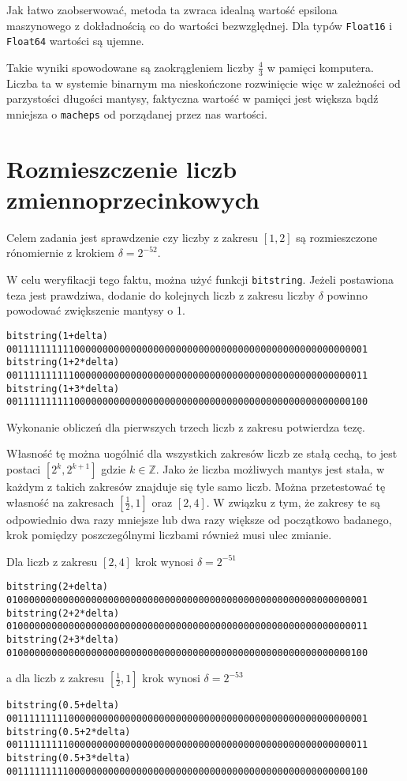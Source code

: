 \documentclass{article}
\begin{document}
Jak łatwo zaobserwować, metoda ta zwraca idealną wartość epsilona maszynowego z dokładnością co do wartości bezwzględnej.
Dla typów \texttt{Float16} i \texttt{Float64} wartości są ujemne.

Takie wyniki spowodowane są zaokrągleniem liczby $\frac{4}{3}$ w pamięci komputera.
Liczba ta w systemie binarnym ma nieskończone rozwinięcie więc w zależności od parzystości długości mantysy, faktyczna wartość w pamięci jest większa bądź mniejsza o \texttt{macheps} od porządanej przez nas wartości.

\section{Rozmieszczenie liczb zmiennoprzecinkowych}

Celem zadania jest sprawdzenie czy liczby z zakresu $[1,2]$ są rozmieszczone rónomiernie z krokiem $\delta = 2^{-52}$.

W celu weryfikacji tego faktu, można użyć funkcji \texttt{bitstring}.
Jeżeli postawiona teza jest prawdziwa, dodanie do kolejnych liczb z zakresu liczby $\delta$ powinno powodować zwiększenie mantysy o 1.

\begin{lstlisting}
bitstring(1+delta) 
0011111111110000000000000000000000000000000000000000000000000001
bitstring(1+2*delta)
0011111111110000000000000000000000000000000000000000000000000011
bitstring(1+3*delta)
0011111111110000000000000000000000000000000000000000000000000100
\end{lstlisting}

Wykonanie obliczeń dla pierwszych trzech liczb z zakresu potwierdza tezę.

Własność tę można uogólnić dla wszystkich zakresów liczb ze stałą cechą, to jest postaci $[2^k, 2^{k+1}]$ gdzie $k \in \mathbb{Z}$.
Jako że liczba możliwych mantys jest stała, w każdym z takich zakresów znajduje się tyle samo liczb.
Można przetestować tę własność na zakresach $[\frac{1}{2}, 1]$ oraz $[2, 4]$.
W związku z tym, że zakresy te są odpowiednio dwa razy mniejsze lub dwa razy większe od początkowo badanego, krok pomiędzy poszczególnymi liczbami również musi ulec zmianie.

Dla liczb z zakresu $[2,4]$ krok wynosi $\delta=2^{-51}$
\begin{lstlisting}
bitstring(2+delta) 
0100000000000000000000000000000000000000000000000000000000000001
bitstring(2+2*delta) 
0100000000000000000000000000000000000000000000000000000000000011
bitstring(2+3*delta) 
0100000000000000000000000000000000000000000000000000000000000100
\end{lstlisting}
a dla liczb z zakresu $[\frac{1}{2}, 1]$ krok wynosi $\delta=2^{-53}$
\begin{lstlisting}
bitstring(0.5+delta) 
0011111111100000000000000000000000000000000000000000000000000001
bitstring(0.5+2*delta) 
0011111111100000000000000000000000000000000000000000000000000011
bitstring(0.5+3*delta) 
0011111111100000000000000000000000000000000000000000000000000100
\end{lstlisting}
\end{document}
